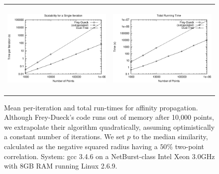 \documentclass{article}
\begin{document}
\begin{figure}
  \begin{tabular}{lr}
    \includegraphics[width=2.6in,height=1.8in]{r-speed.ps}
    &
    \includegraphics[width=2.6in,height=1.8in]{r-total.ps}
  \end{tabular}
  \caption{Mean per-iteration and total run-times for affinity propagation.
      Although Frey-Dueck's code runs out of memory after 10,000 points, we extrapolate their algorithm quadratically, assuming optimistically a constant number of iterations.
      We set $p$ to the median similarity, calculated as the negative squared radius having a $50\%$ two-point correlation.
      System: gcc 3.4.6 on a NetBurst-class Intel Xeon 3.0GHz with 8GB RAM running Linux 2.6.9.}
  \label{fig:speed}
\end{figure}

\appendix
\end{document}
